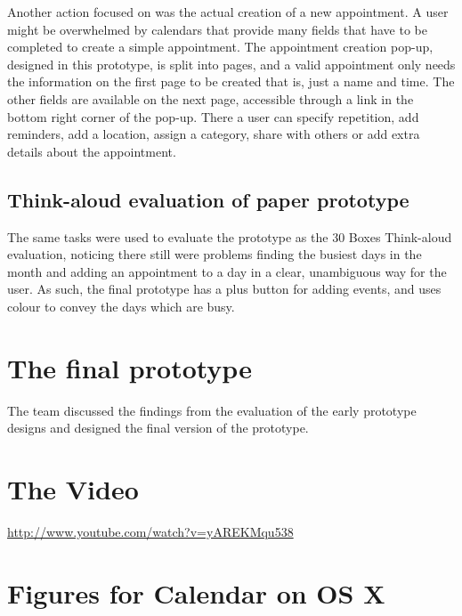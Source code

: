 \documentclass{article}
\begin{document}
Another action focused on was the actual creation of a new
appointment. A user might be overwhelmed by calendars that provide many
fields that have to be completed to create a simple appointment.
The appointment creation pop-up, designed in this prototype, is split
into pages, and a valid appointment only needs the information on the
first page to be created that is, just a name and time. The other
fields are available on the next page, accessible through a link in the
bottom right corner of the pop-up. There a user can specify repetition,
add reminders, add a location, assign a category, share with others or
add extra details about the appointment.

\subsection{Think-aloud evaluation of paper prototype}

The same tasks were used to evaluate the prototype as the 30 Boxes
Think-aloud evaluation, noticing there still were problems finding the
busiest days in the month and adding an appointment to a day in a
clear, unambiguous way for the user. As such, the final prototype has a
plus button for adding events, and uses colour to convey the days which
are busy.


\section{The final prototype}

The team discussed the findings from the evaluation of the early
prototype designs and designed the final version of the prototype.


\section{The Video}

\url{http://www.youtube.com/watch?v=yAREKMqu538}


\appendix

\section{Figures for Calendar on OS X}
\end{document}
